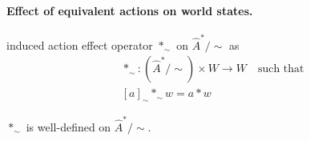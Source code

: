 \paragraph{Effect of equivalent actions on world states.}
 induced action effect operator $\ast_{\sim}$ on $\hat{A}^{*}/\sim$ as
\begin{equation}
\begin{aligned}
    & \ast_{\sim}: (\hat{A}^{*}/\sim) \times W \to W \quad \text{such that} \\
    & [a]_{\sim} \ast_{\sim} w = a \ast w
\end{aligned}
\end{equation}

\begin{propositionE}
    $\ast_{\sim}$ is well-defined on $\hat{A}^{*}/\sim$.
\end{propositionE}
